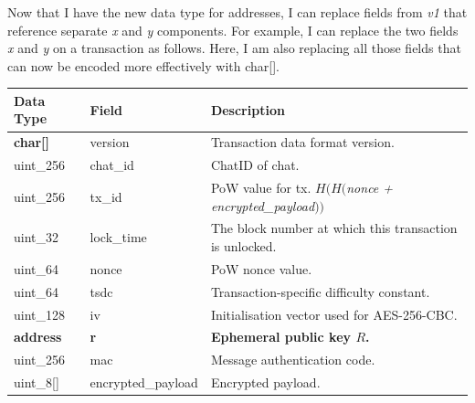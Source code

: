 \documentclass{article}
\begin{document}
Now that I have the new data type for addresses, I can replace fields from \textit{v1} that reference separate \textit{x} and \textit{y} components. For example, I can replace the two fields \textit{x} and \textit{y} on a transaction as follows. Here, I am also replacing all those fields that can now be encoded more effectively with char[\hspace{0.05cm}].
\begin{table}[H]
\centering
\begin{tabular}{|p{1.3cm}|p{3cm}|p{5.5cm}|}
\hline
\rowcolor{tblgrey}
Data Type   & Field       & Description\\ \hline
\textbf{char[\hspace{0.05cm}]}    & version     & Transaction data format version.                          \\ \hline
uint\_256   & chat\_id    & ChatID of chat. \\ \hline
uint\_256   & tx\_id      & PoW value for tx. $H(H($\textit{nonce + encrypted\_payload}$))$ \\ \hline
uint\_32    & lock\_time  & The block number at which this transaction is unlocked. \\ \hline
uint\_64    & nonce       & PoW nonce value. \\ \hline
uint\_64    & tsdc        & Transaction-specific difficulty constant.  \\ \hline
uint\_128   & iv          & Initialisation vector used for AES-256-CBC.   \\ \hline
\textbf{address}     & \textbf{r}           & \textbf{Ephemeral public key $R$.}   \\ \hline
uint\_256   & mac         & Message authentication code. \\ \hline
uint\_8[\hspace{0.05cm}]  & encrypted\_payload & Encrypted payload. \\ \hline
\end{tabular}
\end{table}
\end{document}
